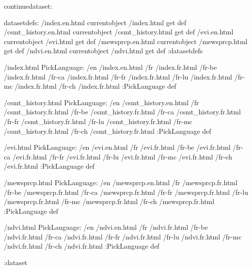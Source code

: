 \begin{ingrid}
continuedataset:

datasetdefs:
/index.en.html currentobject /index.html get def
/csmt_history.en.html currentobject /csmt_history.html get def
/evi.en.html currentobject /evi.html get def
/mewsprcp.en.html currentobject /mewsprcp.html get def
/ndvi.en.html currentobject /ndvi.html get def
:datasetdefs

/index.html {
PickLanguage:
/en /index.en.html
/fr /index.fr.html
/fr-be /index.fr.html
/fr-ca /index.fr.html
/fr-fr /index.fr.html
/fr-lu /index.fr.html
/fr-mc /index.fr.html
/fr-ch /index.fr.html
:PickLanguage
} def

/csmt_history.html {
PickLanguage:
/en /csmt_history.en.html
/fr /csmt_history.fr.html
/fr-be /csmt_history.fr.html
/fr-ca /csmt_history.fr.html
/fr-fr /csmt_history.fr.html
/fr-lu /csmt_history.fr.html
/fr-mc /csmt_history.fr.html
/fr-ch /csmt_history.fr.html
:PickLanguage
} def

/evi.html {
PickLanguage:
/en /evi.en.html
/fr /evi.fr.html
/fr-be /evi.fr.html
/fr-ca /evi.fr.html
/fr-fr /evi.fr.html
/fr-lu /evi.fr.html
/fr-mc /evi.fr.html
/fr-ch /evi.fr.html
:PickLanguage
} def

/mewsprcp.html {
PickLanguage:
/en /mewsprcp.en.html
/fr /mewsprcp.fr.html
/fr-be /mewsprcp.fr.html
/fr-ca /mewsprcp.fr.html
/fr-fr /mewsprcp.fr.html
/fr-lu /mewsprcp.fr.html
/fr-mc /mewsprcp.fr.html
/fr-ch /mewsprcp.fr.html
:PickLanguage
} def

/ndvi.html {
PickLanguage:
/en /ndvi.en.html
/fr /ndvi.fr.html
/fr-be /ndvi.fr.html
/fr-ca /ndvi.fr.html
/fr-fr /ndvi.fr.html
/fr-lu /ndvi.fr.html
/fr-mc /ndvi.fr.html
/fr-ch /ndvi.fr.html
:PickLanguage
} def

:dataset
\end{ingrid}
